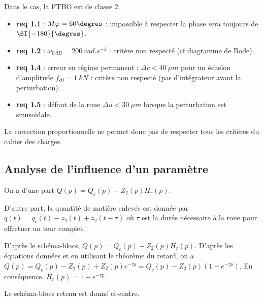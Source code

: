 \ifprof
\begin{corrige}
Dans le cas, la FTBO est de classe 2.
\begin{itemize}
\item \textbf{req 1.1} : $M\varphi = 60\degres$ : impossible à respecter la phase sera toujours de $\SI{-180}{\degres}$.
\item \textbf{req 1.2} : $\omega_{\SI{0}{dB}}=\SI{200}{rad.s^{-1}}$ : critère non respecté (cf diagramme de Bode).
\item \textbf{req 1.4} : erreur en régime permanent : $\Delta c < \SI{40}{\mu m}$ pour un échelon d'amplitude $f_{c0}=\SI{1}{kN}$ : critère non respecté (pas d'intégrateur avant la perturbation).
\item \textbf{req 1.5} : défaut de la roue $\Delta u < \SI{30}{\mu m}$ lorsque la perturbation est sinusoïdale.
\end{itemize}

La correction proportionnelle ne permet donc pas de respecter tous les critères du cahier des charges.


\end{corrige}
\else
\fi

\subsection*{Analyse de l'influence d'un paramètre}

On a d'une part $Q(p) =Q_c (p)-Z_2(p)H_r (p)$. 


D'autre part, la quantité de matière enlevée est donnée par $q(t)=q_c(t)-z_2(t)+z_2\left( t-\tau\right)$ où $\tau$ est la durée nécessaire à la roue pour effectuer
un tour complet. 



\ifprof
\begin{corrige}
D'après le schéma-blocs, $Q(p)=Q_c(p)-Z_2(p)H_r(p)$. 
D'après les équations données et en utilisant le théorème du retard, on a $Q(p)=Q_c(p)-Z_2(p)+Z_2(p)e^{-\tau p}=Q_c(p)-Z_2(p)\left(1-e^{-\tau p}\right)$. En conséquence, $H_r(p)=1-e^{-\tau p}$.
\end{corrige}
\else
\fi

Le schéma-blocs retenu est donné ci-contre. 

